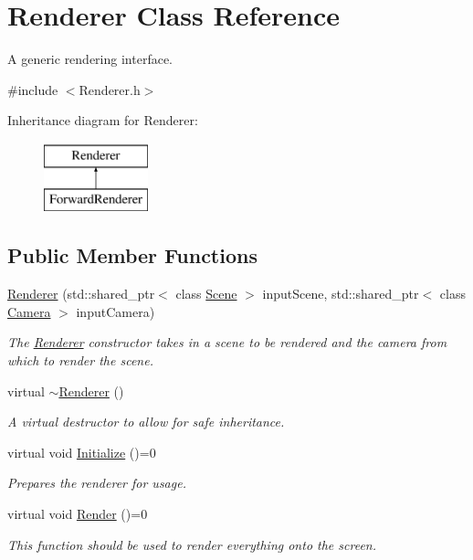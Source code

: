 \hypertarget{class_renderer}{}\section{Renderer Class Reference}
\label{class_renderer}


A generic rendering interface.




{\ttfamily \#include $<$Renderer.\+h$>$}

Inheritance diagram for Renderer\+:\begin{figure}[H]
\begin{center}
\leavevmode
\includegraphics[height=2.000000cm]{class_renderer}
\end{center}
\end{figure}
\subsection*{Public Member Functions}
\begin{DoxyCompactItemize}
\item 
\hyperlink{class_renderer_adc8ce31cd649bdf220ca8355809b1d06}{Renderer} (std\+::shared\+\_\+ptr$<$ class \hyperlink{class_scene}{Scene} $>$ input\+Scene, std\+::shared\+\_\+ptr$<$ class \hyperlink{class_camera}{Camera} $>$ input\+Camera)
\begin{DoxyCompactList}\small\item\em The \hyperlink{class_renderer}{Renderer} constructor takes in a scene to be rendered and the camera from which to render the scene. \end{DoxyCompactList}\item
virtual \hyperlink{class_renderer_afeee408862d5bd6255a6882d47e6d5cd}{$\sim$\+Renderer} ()
\begin{DoxyCompactList}\small\item\em A virtual destructor to allow for safe inheritance. \end{DoxyCompactList}\item
virtual void \hyperlink{class_renderer_a7cb221f355f181d84d66e8c09f50f04a}{Initialize} ()=0
\begin{DoxyCompactList}\small\item\em Prepares the renderer for usage. \end{DoxyCompactList}\item
virtual void \hyperlink{class_renderer_a38623da22aa718cfa41e2514ebd269f5}{Render} ()=0
\begin{DoxyCompactList}\small\item\em This function should be used to render everything onto the screen. \end{DoxyCompactList}\end{DoxyCompactItemize}
